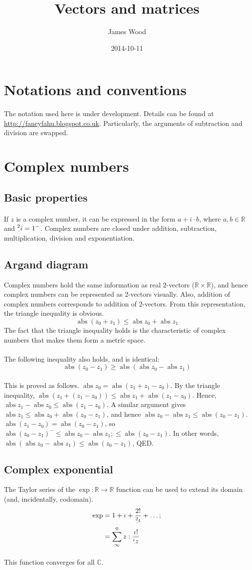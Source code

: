\documentclass[11pt]{article}
\title{\textbf{Vectors and matrices}}
\author{James Wood}
\date{2014-10-11}
\newcommand*\C{\ensuremath{\mathbb C}}
\newcommand*\R{\ensuremath{\mathbb R}}
\newcommand*\id{\iota}
\newcommand*\cd{\cdot}
\newcommand*\prg{\paragraph}
\newcommand*\pt{\prescript}
\DeclareMathOperator{\abs}{abs}
\begin{document}
\maketitle

\section*{Notations and conventions}
\prg{}The notation used here is under development. Details can be found at \url{http://fancyfahu.blogspot.co.uk}. Particularly, the arguments of subtraction and division are swapped.

\section{Complex numbers}
\subsection{Basic properties}
\prg{}If $z$ is a complex number, it can be expressed in the form $a+i\cd b$, where $a,b\in\mathbb R$ and $\pt 2 \cd i=1^-$. Complex numbers are closed under addition, subtraction, multiplication, division and exponentiation.

\subsection{Argand diagram}
Complex numbers hold the same information as real 2-vectors ($\R\times\R$), and hence complex numbers can be represented as 2-vectors visually. Also, addition of complex numbers corresponds to addition of 2-vectors. From this representation, the triangle inequality is obvious.
$$
\abs(z_0+z_1)\leq\abs z_0+\abs z_1
$$
The fact that the triangle inequality holds is the characteristic of complex numbers that makes them form a metric space.

\prg{}The following inequality also holds, and is identical:
$$
\abs(z_0-z_1)\geq\abs(\abs z_0-\abs z_1)
$$
\prg{}This is proved as follows. $\abs z_0=\abs(z_1+z_1-z_0)$. By the triangle inequality,
$\abs(z_1+(z_1-z_0))\leq\abs z_1+\abs(z_1-z_0)$. Hence, $\abs z_1-\abs z_0\leq\abs(z_1-z_0)$. A similar argument gives $\abs z_1\leq\abs z_0+\abs(z_0-z_1)$, and hence $\abs z_0-\abs z_1\leq\abs(z_0-z_1)$. $\abs(z_1-z_0)=\abs(z_0-z_1)$, so
$\abs(z_0-z_1)^-\leq\abs z_0-\abs z_1;\leq\abs(z_0-z_1)$. In other words, $\abs(\abs z_0-\abs z_1)\leq\abs(z_0-z_1)$, QED.

\subsection{Complex exponential}
The Taylor series of the $\exp:\R\rightarrow\R$ function can be used to extend its domain (and, incidentally, codomain).
\[
\begin{aligned}
\exp&=1+\id+\frac{2!}{\pt 2\cd\id}+\hdots; \\
    &=\sum^0_\infty z:\frac{\id!}{\pt\id\cd z}
\end{aligned}
\]
\prg{}This function converges for all $\C$.
\end{document}

